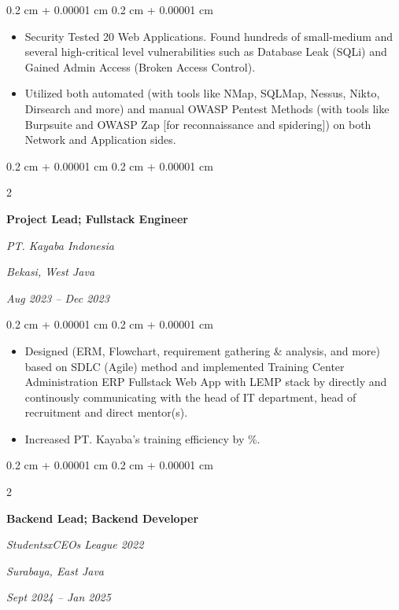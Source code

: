\documentclass[10pt, letterpaper]{article}
\newenvironment{highlights}{
    \begin{itemize}[
        topsep=0.10 cm,
        parsep=0.10 cm,
        partopsep=0pt,
        itemsep=0pt,
        leftmargin=0.4 cm + 10pt
    ]
}{
    \end{itemize}
} %
\newenvironment{onecolentry}{
    \begin{adjustwidth}{
        0.2 cm + 0.00001 cm
    }{
        0.2 cm + 0.00001 cm
    }
}{
    \end{adjustwidth}
} %
\newenvironment{twocolentry}[2][]{
    \onecolentry
    \def\secondColumn{#2}
    \setcolumnwidth{\fill, 4.5 cm}
    \begin{paracol}{2}
}{
    \switchcolumn \raggedleft \secondColumn
    \end{paracol}
    \endonecolentry
} %
\begin{document}
        \vspace{0.10 cm}
        \begin{onecolentry}
            \begin{highlights}
                \item Security Tested 20 Web Applications. Found hundreds of small-medium and several high-critical level vulnerabilities such as Database Leak (SQLi) and Gained Admin Access (Broken Access Control).
                \item Utilized both automated (with tools like NMap, SQLMap, Nessus, Nikto, Dirsearch and more) and manual OWASP Pentest Methods (with tools like Burpsuite and OWASP Zap [for reconnaissance and spidering]) on both Network and Application sides.
            \end{highlights}
        \end{onecolentry}

        \vspace{0.2 cm}

        \begin{twocolentry}{
        \textit{Bekasi, West Java}    
            
        \textit{Aug 2023 – Dec 2023}}
            \textbf{Project Lead; Fullstack Engineer}
            
            \textit{PT. Kayaba Indonesia}
        \end{twocolentry}

        \vspace{0.10 cm}
        \begin{onecolentry}
            \begin{highlights}
                \item Designed (ERM, Flowchart, requirement gathering \& analysis, and more) based on SDLC (Agile) method and implemented Training Center Administration ERP Fullstack Web App with LEMP stack by directly and continously communicating with the head of IT department, head of recruitment and direct mentor(s).
                \item Increased PT. Kayaba's training efficiency by \%.
            \end{highlights}
        \end{onecolentry}

        \vspace{0.2 cm}

        \begin{twocolentry}{
        \textit{Surabaya, East Java}    
            
        \textit{Sept 2024 – Jan 2025}}
            \textbf{Backend Lead; Backend Developer}
            
            \textit{StudentsxCEOs League 2022}
        \end{twocolentry}
\end{document}
